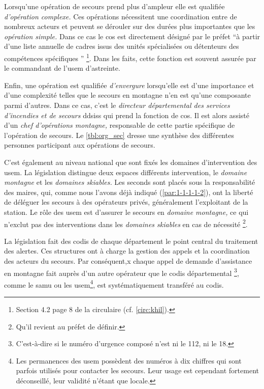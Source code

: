 Lorsqu'une opération de secours prend plus d'ampleur elle est
qualifiée \emph{d'opération complexe.} Ces opérations nécessitent une
coordination entre de nombreux acteurs et peuvent se dérouler sur des
durées plus importantes que les \emph{opération simple.} Dans ce cas
le \ac{cos} est directement désigné par le préfet \enquote{à partir
  d’une liste annuelle de cadres issus des unités spécialisées ou
  détenteurs des compétences spécifiques \textelp{}} \footnote{Section
  4.2 page 8 de la circulaire 
  (cf. \autoref{circ:khil}).}. Dans les faits, cette fonction est
souvent assurée par le commandant de l'\ac{usem} d'astreinte.

Enfin, une opération est qualifiée \emph{d'envergure} lorsqu'elle est
d'une importance et d'une complexité telles que le secours en montagne
n'en est qu'une composante parmi d'autres. Dans ce cas, c'est le
\emph{directeur départemental des services d'incendies et de secours}
\acp{ddsis} qui prend la fonction de \ac{cos}. Il est alors assisté
d'un \emph{chef d'opérations montagne,} responsable de cette partie
spécifique de l'opération de secours. Le \autoref{tbl:org_sec} dresse
une synthèse des différentes personnes participant aux opérations de
secours.

C'est également au niveau national que sont fixés les domaines
d'intervention des \ac{usem}. La législation distingue deux espaces
différents intervention, le \emph{domaine montagne} et les
\emph{domaines skiables.} Les seconds sont placés sous la
responsabilité des maires, qui, comme nous l'avons déjà indiqué
(\ref{par:1-1-1-1-2}), ont la liberté de déléguer les secours à des
opérateurs privés, généralement l'exploitant de la station. Le rôle
des \ac{usem} est d'assurer le secours en \emph{domaine montagne,} ce
qui n’exclut pas des interventions dans les \emph{domaines skiables}
en cas de nécessité \footnote{Qu'il revient au préfet de définir.}.

La législation fait des \ac{codis} de chaque département le point
central du traitement des alertes. Ces structures ont à charge la
gestion des appels et la coordination des acteurs du secours. Par
conséquent,x chaque appel de demande d'assistance en montagne fait
auprès d'un autre opérateur que le \ac{codis} départemental
\footnote{C'est-à-dire si le numéro d'urgence composé n'est ni le 112,
  ni le 18.}, comme le \ac{samu} ou les \ac{usem}\footnote{Les
  permanences des \ac{usem} possèdent des numéros à dix chiffres qui
  sont parfois utilisés pour contacter les secours. Leur usage est
  cependant fortement déconseillé, leur validité n'étant que locale.},
est systématiquement transféré au \ac{codis}.

